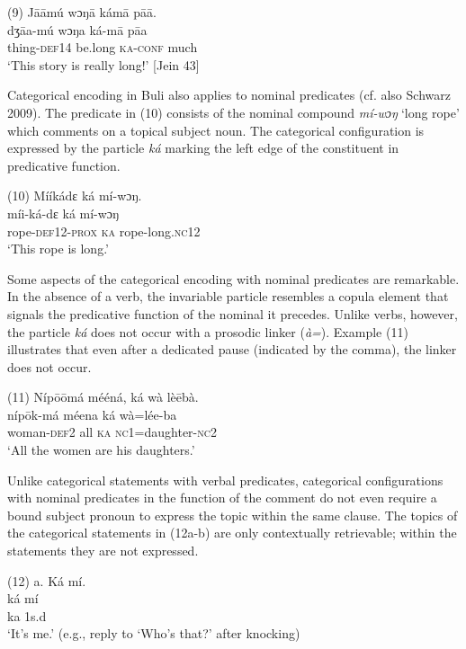 \documentclass[output=paper]{langsci/langscibook}
\begin{document}
\ea
\glll \textup{(9)}  J\={a}\={a}mú    wɔŋ\={a}    kám\={a}    p\={a}\={a}.\\
  \textup{dʒ\={a}a-mú  wɔŋa    ká-m\={a}    p\={a}a}\\
     thing-\textsc{def}14  be.long  \textsc{ka}{}-\textsc{conf}  much\\
\glt ‘This story is really long!’ [Jein 43]
\z

Categorical encoding in Buli also applies to nominal predicates (cf. also Schwarz 2009). The predicate in (10) consists of the nominal compound \textit{mí-wɔŋ}\textit{}‘long rope’ which comments on a topical subject noun. The categorical configuration is expressed by the particle \textit{ká} marking the left edge of the constituent in predicative function. 

\ea
\glll \textup{(10)  }Mííkádɛ    ká  mí-wɔŋ.\\
  \textup{  míi-ká-dɛ    ká  mí-wɔŋ}\\
       rope-\textsc{def}12-\textsc{prox}  \textsc{ka}  rope-long.\textsc{nc}12\\
\glt ‘This rope is long.’ \citep[267]{Schwarz2009}
\z

Some aspects of the categorical encoding with nominal predicates are remarkable. In the absence of a verb, the invariable particle resembles a copula element that signals the predicative function of the nominal it precedes. Unlike verbs, however, the particle \textit{ká }does not occur with a prosodic linker (\textit{à=}). Example (11) illustrates that even after a dedicated pause (indicated by the comma), the linker does not occur.

\ea
\glll \textup{(11)}  \textup{Níp\={o}\={o}má  mééná,    ká  wà  lè\={e}bà.}\\
  \textup{  níp\={o}k-má  méena    ká  wà=lée-ba}\\
       woman-\textsc{def}2  all    \textsc{ka}  \textsc{nc}1=daughter-\textsc{nc}2\\
\glt ‘All the women are his daughters.’ \citep[268]{Schwarz2009}
\z

Unlike categorical statements with verbal predicates, categorical configurations with nominal predicates in the function of the comment do not even require a bound subject pronoun to express the topic within the same clause. The topics of the categorical statements in (12a-b) are only contextually retrievable; within the statements they are not expressed.     

\ea
\glll \textup{(12)}  \textup{a.}  Ká  mí.\\
  \textup{ká  mí}\\
     ka  1s.d\\
\glt   ‘It’s me.’ (e.g., reply to ‘Who’s that?’ after knocking) \citep[269]{Schwarz2009}
\z
\end{document}
